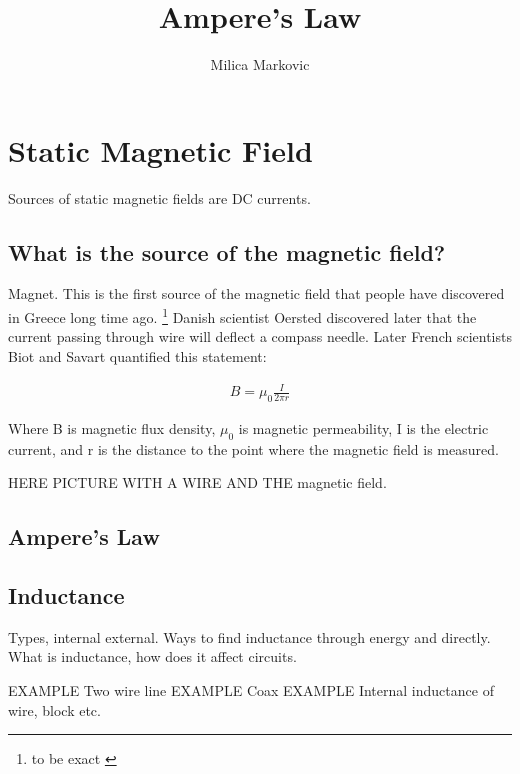 \documentclass{ximera}
\title{Ampere's Law}
\author{Milica Markovic}
\begin{document}
  
\begin{abstract}  

\end{abstract}  
\maketitle    


\section{Static Magnetic Field}

Sources of static magnetic fields are DC currents.

\subsection{What is the source of the magnetic field?}

Magnet. This is the first source of the magnetic field that people have discovered in Greece long time ago. \footnote{to be exact } Danish scientist Oersted discovered later that the current passing through wire will deflect a compass needle. Later French scientists Biot and Savart quantified this statement:

\begin{eqnarray}
B = \mu_0 \frac{I}{2 \pi r}
\end{eqnarray}

Where B is magnetic flux density, $\mu_0$ is magnetic permeability, I is the electric current, and r is the distance to the point where the magnetic field is measured.

HERE PICTURE WITH A WIRE AND THE magnetic field.





\subsection{Ampere's Law}


\subsection{Inductance}
Types, internal external.  Ways to find inductance through energy and directly. What is inductance, how does it affect circuits.

{\large EXAMPLE} Two wire line
{\large EXAMPLE} Coax
{\large EXAMPLE} Internal inductance of wire, block etc.
\end{document}
